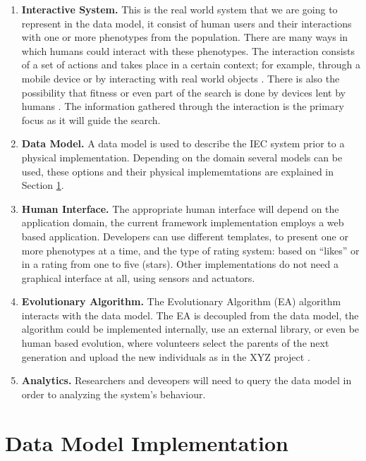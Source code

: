 \begin{enumerate}
  \item {\bf Interactive System.} 
  This is the real world system that we are going to represent in the data model, 
  it consist of human users and their interactions with one or more phenotypes
  from the population. There are many ways in which humans could interact 
  with these phenotypes. The interaction consists of a set of actions and 
  takes place in a certain context; for example, through a mobile device  
  or by interacting with real world objects 
  \cite{de2014artists,de2013unplugging}. 
  There is also the possibility that fitness or even part of the search 
  is done by devices lent by humans \cite{DBLP:conf/gecco/MereloCGCRV16}.
  The information gathered through the interaction is the primary focus
  as it will guide the search. 

  \item {\bf Data Model.}
  A data model is used to describe the IEC system prior to a physical 
  implementation.  Depending on the domain several models can be used, these
  options and their physical implememtations are explained in Section \ref{sec:implementation}.

  \item {\bf Human Interface.}
  The appropriate human interface will depend on the application domain, 
  the current framework implementation employs a web based application. Developers 
  can use different templates, to present one or more phenotypes 
  at a time, and the type of rating system:  based on ``likes'' or in a rating from one to five (stars). 
  Other implementations do not need a graphical interface at all, using sensors and actuators.   

  \item {\bf Evolutionary Algorithm.}
  The Evolutionary Algorithm (EA) algorithm interacts with the data model.     
  The EA is decoupled from the data model, the algorithm could be implemented internally, 
  use an external library, or even be human based evolution, 
  where volunteers select the parents of the next generation and upload the 
  new individuals as in the XYZ project \cite{de2014artists}.  

  \item {\bf Analytics.} 
  Researchers and deveopers will need to query the data model in order to analyzing the 
  system's behaviour. 

\end{enumerate}

\section{Data Model Implementation}
\label{sec:implementation}

